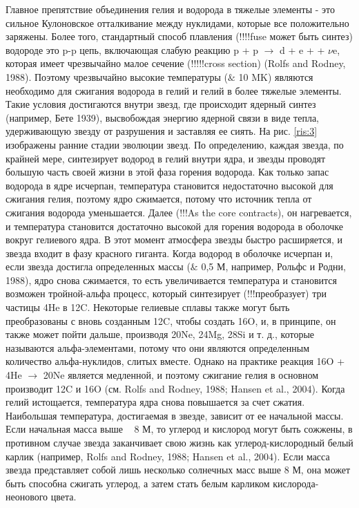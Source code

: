 \documentclass[%
bachelor,    %
natbib,      %
subf,        %
href,        %
colorlinks,  %
]{disser}
\begin{document}
Главное препятствие объединения гелия и водорода в тяжелые элементы - это сильное Кулоновское отталкивание между нуклидами, которые все положительно заряжены. Более того, стандартный способ плавления (!!!!fuse может быть синтез) водороде это p-p цепь, включающая слабую реакцию p + p $\rightarrow$ d + e + + $\nu$e, которая имеет чрезвычайно малое сечение (!!!!!cross section) (Rolfs and Rodney, 1988). Поэтому чрезвычайно высокие температуры ($\&$ 10 MK) являются необходимо для сжигания водорода в гелий и гелий в более тяжелые элементы. Такие условия достигаются внутри звезд, где происходит ядерный синтез (например, Бете 1939), высвобождая энергию ядерной связи в виде тепла, удерживающую звезду от разрушения и заставляя ее сиять.
На рис. \ref{ris:3} изображены ранние стадии эволюции звезд. По определению, каждая звезда, по крайней мере, синтезирует водород в гелий внутри ядра, и звезды проводят большую часть своей жизни в этой фаза горения водорода. Как только запас водорода в ядре исчерпан, температура становится недостаточно высокой для сжигания гелия, поэтому ядро сжимается, потому что источник тепла от сжигания водорода уменьшается. Далее (!!!As the core contracts), он нагревается, и температура становится достаточно высокой для горения водорода в оболочке вокруг гелиевого ядра. В этот момент атмосфера звезды быстро расширяется, и звезда входит в фазу красного гиганта. Когда водород в оболочке исчерпан и, если звезда достигла определенных массы ($\&$ 0,5 М, например, Рольфс и Родни, 1988), ядро снова сжимается, то есть увеличивается температура и становится возможен тройной-альфа процесс, который синтезирует (!!!преобразует) три частицы 4He в 12C. Некоторые гелиевые сплавы также могут быть преобразованы с вновь созданным 12C, чтобы создать 16O, и, в принципе, он также может пойти дальше, производя 20Ne, 24Mg, 28Si и т. д., которые называются альфа-элементами, потому что они являются определенным количество альфа-нуклидов, слитых вместе. Однако на практике реакция 16O + 4He $\rightarrow$ 20Ne является медленной, и поэтому сжигание гелия в основном производит 12C и 16O (см. Rolfs and Rodney, 1988; Hansen et al., 2004). Когда гелий истощается, температура ядра снова повышается за счет сжатия. Наибольшая температура, достигаемая в звезде, зависит от ее начальной массы. Если начальная масса выше ~ 8 М, то углерод и кислород могут быть сожжены, в противном случае звезда заканчивает свою жизнь как углерод-кислородный белый карлик (например, Rolfs and Rodney, 1988; Hansen et al., 2004). Если масса звезда представляет собой лишь несколько солнечных масс выше 8 М, она может быть способна сжигать углерод, а затем стать белым карликом кислорода-неонового цвета.
\end{document}
